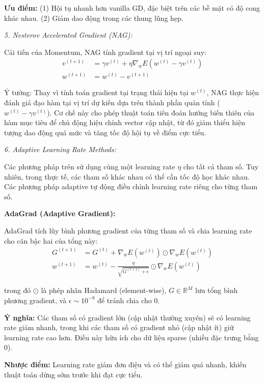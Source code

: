 \textbf{Ưu điểm:} (1) Hội tụ nhanh hơn vanilla GD, đặc biệt trên các bề mặt có độ cong khác nhau. (2) Giảm dao động trong các thung lũng hẹp.

\noindent\textcolor{infocolor}{\textit{5. Nesterov Accelerated Gradient (NAG):}}

Cải tiến của Momentum, NAG tính gradient tại vị trí ngoại suy:
\begin{align*}
v^{(t+1)} &= \gamma v^{(t)} + \eta \nabla_w E(w^{(t)} - \gamma v^{(t)}) \\
w^{(t+1)} &= w^{(t)} - v^{(t+1)}
\end{align*}


Ý tưởng: Thay vì tính toán gradient tại trạng thái hiện tại $w^{(t)}$, NAG thực hiện đánh giá đạo hàm tại vị trí dự kiến dựa trên thành phần quán tính ($w^{(t)} - \gamma v^{(t)}$). Cơ chế này cho phép thuật toán tiên đoán hướng biến thiên của hàm mục tiêu để chủ động hiệu chỉnh vector cập nhật, từ đó giảm thiểu hiện tượng dao động quá mức và tăng tốc độ hội tụ về điểm cực tiểu.

\noindent\textcolor{infocolor}{\textit{6. Adaptive Learning Rate Methods:}}

Các phương pháp trên sử dụng cùng một learning rate $\eta$ cho tất cả tham số. Tuy nhiên, trong thực tế, các tham số khác nhau có thể cần tốc độ học khác nhau. Các phương pháp adaptive tự động điều chỉnh learning rate riêng cho từng tham số.

\textbf{AdaGrad (Adaptive Gradient):}

AdaGrad tích lũy bình phương gradient của từng tham số và chia learning rate cho căn bậc hai của tổng này:
\begin{align*}
G^{(t+1)} &= G^{(t)} + \nabla_w E(w^{(t)}) \odot \nabla_w E(w^{(t)}) \\
w^{(t+1)} &= w^{(t)} - \frac{\eta}{\sqrt{G^{(t+1)} + \epsilon}} \odot \nabla_w E(w^{(t)})
\end{align*}

trong đó $\odot$ là phép nhân Hadamard (element-wise), $G \in \mathbb{R}^M$ lưu tổng bình phương gradient, và $\epsilon \sim 10^{-8}$ để tránh chia cho 0.

\textbf{Ý nghĩa:} Các tham số có gradient lớn (cập nhật thường xuyên) sẽ có learning rate giảm nhanh, trong khi các tham số có gradient nhỏ (cập nhật ít) giữ learning rate cao hơn. Điều này hữu ích cho dữ liệu sparse (nhiều đặc trưng bằng 0).

\textbf{Nhược điểm:} Learning rate giảm đơn điệu và có thể giảm quá nhanh, khiến thuật toán dừng sớm trước khi đạt cực tiểu.


